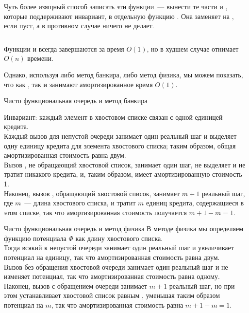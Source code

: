 \begin{frame}[fragile]{}
Чуть более изящный способ записать эти функции~--- вынести те части
 и , которые поддерживают инвариант, в
отдельную функцию . Она заменяет  на
, если  пуст, а в противном случае
ничего не делает.

\inputminted[firstline=10,lastline=15] {haskell}{code/NaiveQueue.hs}

Функции
 и  всегда завершаются за время
$O(1)$, но  в худшем случае отнимает $O(n)$
времени. 

Однако, используя либо метод банкира, либо метод физика, мы
можем показать, что как , так и 
занимают амортизированное время $O(1)$.

\end{frame}


\begin{frame}[fragile]{Чисто функциональная очередь и метод банкира}

Инвариант: каждый элемент в
хвостовом списке связан с одной единицей кредита. \\

Каждый вызов
 для непустой очереди занимает один реальный шаг и
выделяет одну единицу кредита для элемента хвостового списка; таким
образом, общая амортизированная стоимость равна двум. \\

Вызов
, не обращающий хвостовой список, занимает один шаг,
не выделяет и не тратит никакого кредита, и, таким образом, имеет
амортизированную стоимость 1. \\

Наконец, вызов ,
обращающий хвостовой список, занимает $m+1$ реальный шаг, где $m$~---
длина хвостового списка, и тратит $m$ единиц кредита, содержащиеся в
этом списке, так что амортизированная стоимость получается $m + 1 - m
= 1$.

\end{frame}


\begin{frame}[fragile]{Чисто функциональная очередь и метод физика}
В методе физика мы определяем функцию потенциала $\Phi$ как длину
хвостового списка. \\

Тогда всякий  к непустой очереди
занимает один реальный шаг и увеличивает потенциал на единицу, так что
амортизированная стоимость равна двум. \\

Вызов  без
обращения хвостовой очереди занимает один реальный шаг и не изменяет
потенциал, так что амортизированная стоимость равна одному.\\

 Наконец,
вызов  с обращением очереди занимает $m+1$ реальный
шаг, но при этом устанавливает хвостовой список равным \hsinline{[]},
уменьшая таким образом потенциал на $m$, так что амортизированная
стоимость равна $m + 1 - m = 1$.

\end{frame}



